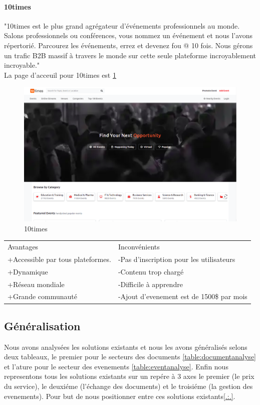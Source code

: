 \documentclass[12pt]{report}
\begin{document}
\paragraph{10times}

"10times est le plus grand agrégateur d'événements professionnels au monde. Salons professionnels ou conférences, vous nommez un événement et nous l'avons répertorié. Parcourez les événements, errez et devenez fou @ 10 fois. Nous gérons un trafic B2B massif à travers le monde sur cette seule plateforme incroyablement incroyable." \cite{23}\\
La page d'acceuil pour 10times est \ref{fig:10times}

\begin{figure}[h]
    \centering
    \includegraphics[width=.8\textwidth]{10times}
    \caption{10times}
    \label{fig:10times}
\end{figure}

\begin{table}[h!]
\begin{center}
\begin{tabular}{ p{8cm}  p{8cm}  }
Avantages & Inconvénients \\
+Accessible par tous plateformes. & -Pas d'inscription pour les utilisateurs \\ 
+Dynamique & -Contenu trop chargé  \\
+Réseau mondiale & -Difficile à apprendre \\
+Grande communauté & -Ajout d'evenement est de  1500\$ par mois\\
\end{tabular}
\end{center}
\end{table}


\subsection{Généralisation}
Nous avons analysées les solutions existants et nous les avons généralisés selons deux tableaux, le premier pour le secteurs des documents \ref{table:documentanalyse} et l'ature pour le secteur des evenements \ref{table:eventanalyse}. Enfin nous representons tous les solutions existants sur un repére à 3 axes le premier (le prix du service), le deuxiéme (l'échange des documents) et le troisiéme (la gestion des evenements). Pour but de nous positionner entre ces solutions existants\ref{.:.}.
\end{document}
